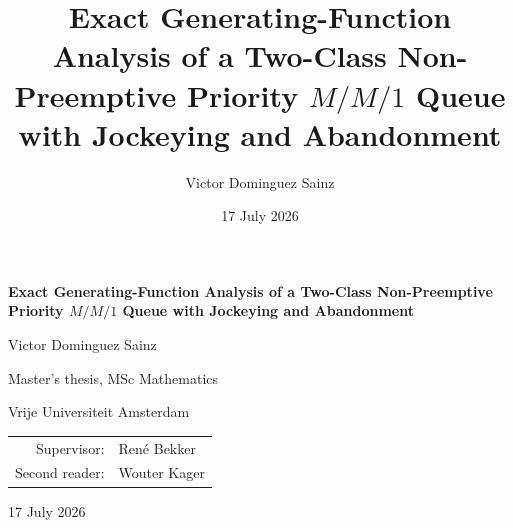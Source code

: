 \documentclass{article}
\title{Exact Generating-Function Analysis of a Two-Class Non-Preemptive Priority
\texorpdfstring{$M/M/1$}{M/M/1} Queue with Jockeying and Abandonment}
\author{Victor Dominguez Sainz}
\date{17 July 2026}
\numberwithin{equation}{section}
\theoremstyle{remark}
\theoremstyle{plain}
\begin{document}
\begin{titlepage}
\centering
\vspace*{2cm}

{\LARGE\bfseries Exact Generating-Function Analysis of a Two-Class
Non-Preemptive Priority $M/M/1$ Queue with Jockeying and Abandonment\par}

\vspace{2cm}
{\Large Victor Dominguez Sainz\par}

\vspace{1cm}
{\large Master's thesis, MSc Mathematics\par}
{\large Vrije Universiteit Amsterdam\par}

\vfill

{\large
\begin{tabular}{rl}
Supervisor:    & René Bekker \\
Second reader: & Wouter Kager \\
\end{tabular}\par}

\vspace{1.5cm}
{\large 17 July 2026\par}

\end{titlepage}
\end{document}

